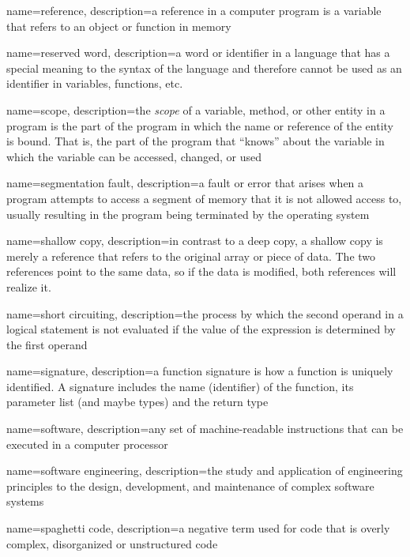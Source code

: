 {
  name=reference,
  description={a reference in a computer program is a variable that refers to an object or function in memory}
}

{
  name=reserved word,
  description={a word or identifier in a language that has a special meaning to the syntax of the language and 
  	therefore cannot be used as an identifier in variables, functions, etc.}
}

{
  name=scope,
  description={the \emph{scope} of a variable, method, or other entity in a program
  	is the part of the program in which the name or reference of the entity is bound.
	That is, the part of the program that ``knows'' about the variable in which the variable
	can be accessed, changed, or used}
}

{
  name=segmentation fault,
  description={a fault or error that arises when a program attempts to access a segment of memory that it is not allowed access to, usually resulting in the program being terminated by the operating system}
}

{
  name=shallow copy,
  description={in contrast to a deep copy, a shallow copy is merely a reference that refers to the original array or piece of data.  The two references point to the same data, so if the data is modified, both references will realize it.}
}

{
  name=short circuiting,
  description={the process by which the second operand in a logical statement is not evaluated if the
  	value of the expression is determined by the first operand}
}

{
  name=signature,
  description={a function signature is how a function is uniquely identified.  A signature includes the name (identifier) of the function, its parameter list (and maybe types) and the return type}
}

{
  name=software,
  description={any set of machine-readable instructions that can be executed in a computer processor}
}

{
  name=software engineering,
  description={the study and application of engineering principles to the design, development, and maintenance of complex software systems}
}

{
  name=spaghetti code,
  description={a negative term used for code that is overly complex, disorganized or unstructured code}
}

